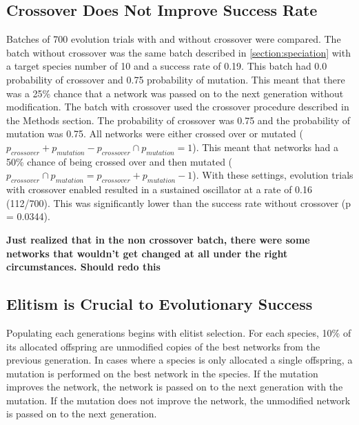\documentclass[12pt]{report}
\begin{document}
\subsection{Crossover Does Not Improve Success Rate}
Batches of 700 evolution trials with and without crossover were compared. The batch without crossover was the same batch described in \ref{section:speciation} with a target species number of 10 and a success rate of 0.19. This batch had 0.0 probability of crossover and 0.75 probability of mutation. This meant that there was a 25\% chance that a network was passed on to the next generation without modification. The batch with crossover used the crossover procedure described in the Methods section. The probability of crossover was 0.75 and the probability of mutation was 0.75. All networks were either crossed over or mutated ($p_{crossover} + p_{mutation} - p_{crossover} \cap p_{mutation} = 1$). This meant that networks had a 50\% chance of being crossed over and then mutated ($p_{crossover} \cap p_{mutation} = p_{crossover} + p_{mutation} -1$). With these settings, evolution trials with crossover enabled resulted in a sustained oscillator at a rate of 0.16 (112/700). This was significantly lower than the success rate without crossover (p = 0.0344).


\textbf{Just realized that in the non crossover batch, there were some networks that wouldn't get changed at all under the right circumstances. Should redo this}

\subsection{Elitism is Crucial to Evolutionary Success}
\label{section:elites}
Populating each generations begins with elitist selection. For each species, 10\% of its allocated offspring are unmodified copies of the best networks from the previous generation. In cases where a species is only allocated a single offspring, a mutation is performed on the best network in the species. If the mutation improves the network, the network is passed on to the next generation with the mutation. If the mutation does not improve the network, the unmodified network is passed on to the next generation.
\end{document}
